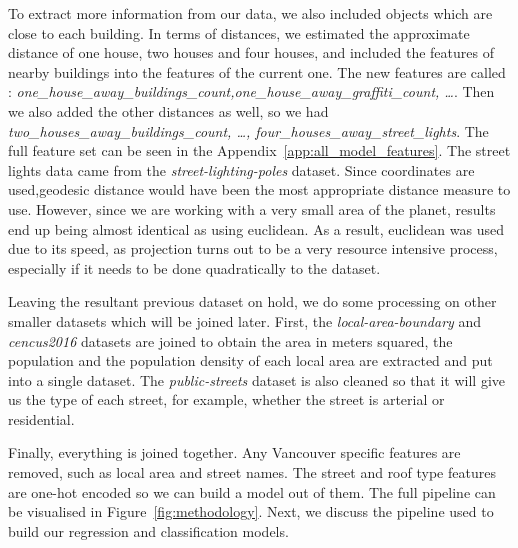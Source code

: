 To extract more information from our data, we also included objects which are close to each building. In terms of distances, we estimated the approximate distance of one house, two houses and four houses, and included the features of nearby buildings into the features of the current one. The new features are called : \textit{one\_house\_away\_buildings\_count,one\_house\_away\_graffiti\_count, \ldots}. Then we also added the other distances as well, so we had \textit{two\_houses\_away\_buildings\_count, \ldots, four\_houses\_away\_street\_lights}. The full feature set can be seen in the Appendix~\ref{app:all_model_features}. The street lights data came from the \textit{street-lighting-poles} dataset. Since coordinates are used,geodesic distance would have been the most appropriate distance measure to use. However, since we are working with a very small area of the planet, results end up being almost identical as using euclidean. As a result, euclidean was used due to its speed, as projection turns out to be a very resource intensive process, especially if it needs to be done quadratically to the dataset.

Leaving the resultant previous dataset on hold, we do some processing on other smaller datasets which will be joined later. First, the \textit{local-area-boundary} and \textit{cencus2016} datasets are joined to obtain the area in meters squared, the population and the population density of each local area are extracted and put into a single dataset. The \textit{public-streets} dataset is also cleaned so that it will give us the type of each street, for example, whether the street is arterial or residential.

Finally, everything is joined together. Any Vancouver specific features are removed, such as local area and street names. The street and roof type features are one-hot encoded so we can build a model out of them. The full pipeline can be visualised in Figure~\ref{fig:methodology}. Next, we discuss the pipeline used to build our regression and classification models.

